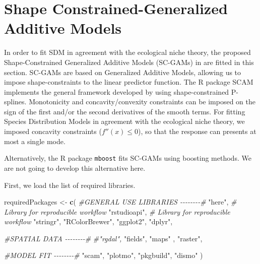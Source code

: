 \documentclass[
]{book}
\newenvironment{Shaded}{\begin{snugshade}}{\end{snugshade}}
\newcommand{\CommentTok}[1]{\textcolor[rgb]{0.56,0.35,0.01}{\textit{#1}}}
\newcommand{\FunctionTok}[1]{\textcolor[rgb]{0.13,0.29,0.53}{\textbf{#1}}}
\newcommand{\NormalTok}[1]{#1}
\newcommand{\OtherTok}[1]{\textcolor[rgb]{0.56,0.35,0.01}{#1}}
\newcommand{\StringTok}[1]{\textcolor[rgb]{0.31,0.60,0.02}{#1}}
\begin{document}
\chapter{Shape Constrained-Generalized Additive Models}\label{shape-constrained-generalized-additive-models}

In order to fit SDM in agreement with the ecological niche theory, the proposed Shape-Constrained Generalized Additive Models (SC-GAMs) in \citep{citores_etal_2020} are fitted in this section. SC-GAMs are based on Generalized Additive Models, allowing us to impose shape-constraints to the linear predictor function. The R package SCAM implements the general framework developed by \citep{pya_etal_2015} using shape-constrained P-splines. Monotonicity and concavity/convexity constraints can be imposed on the sign of the first and/or the second derivatives of the smooth terms. For fitting Species Distribution Models in agreement with the ecological niche theory, we imposed concavity constraints (\(f''(x) \le 0\)), so that the response can presents at most a single mode.

Alternatively, the R package \texttt{mboost} fits SC-GAMs using boosting methods. We are not going to develop this alternative here.

First, we load the list of required libraries.

\begin{Shaded}
\begin{Highlighting}[]
\NormalTok{requiredPackages }\OtherTok{\textless{}{-}} \FunctionTok{c}\NormalTok{(}
  \CommentTok{\#GENERAL USE LIBRARIES {-}{-}{-}{-}{-}{-}{-}{-}\#}
  \StringTok{"here"}\NormalTok{, }\CommentTok{\# Library for reproducible workflow}
  \StringTok{"rstudioapi"}\NormalTok{,  }\CommentTok{\# Library for reproducible workflow}
  \StringTok{"stringr"}\NormalTok{,}
  \StringTok{"RColorBrewer"}\NormalTok{,  }
  \StringTok{"ggplot2"}\NormalTok{,}
  \StringTok{"dplyr"}\NormalTok{,}
  
  \CommentTok{\#SPATIAL DATA {-}{-}{-}{-}{-}{-}{-}{-}\#}
  \CommentTok{\#"rgdal",}
  \StringTok{"fields"}\NormalTok{,}
  \StringTok{"maps"}\NormalTok{ ,}
  \StringTok{"raster"}\NormalTok{,}

  \CommentTok{\#MODEL FIT {-}{-}{-}{-}{-}{-}{-}{-}\#}
  \StringTok{"scam"}\NormalTok{,}
  \StringTok{"plotmo"}\NormalTok{,}
  \StringTok{"pkgbuild"}\NormalTok{,}
  \StringTok{"dismo"}
\NormalTok{  )}
\end{Highlighting}
\end{Shaded}
\end{document}
